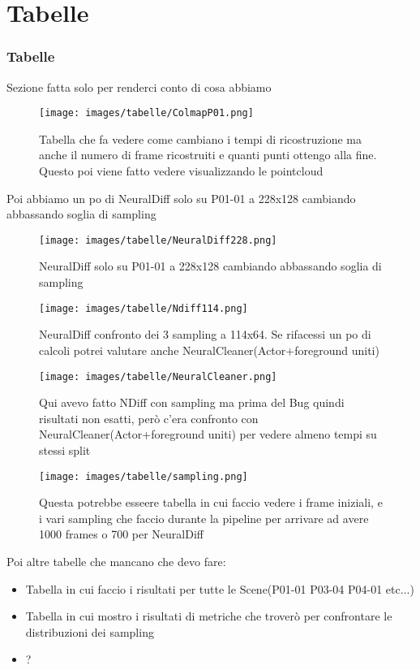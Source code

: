 \part{Tabelle}\label{sec:Tabelle}
\section{Tabelle}
Sezione fatta solo per renderci conto di cosa abbiamo
\begin{figure}
    \centering
    \texttt{[image: images/tabelle/ColmapP01.png]} 
    \caption{Tabella che fa vedere come cambiano i tempi di ricostruzione ma
    anche il numero di frame ricostruiti e quanti punti ottengo alla fine. Questo poi
    viene fatto vedere visualizzando le pointcloud}\label{fig:blender1}
\end{figure}


Poi abbiamo un po di NeuralDiff solo su P01-01 a 228x128 cambiando abbassando soglia di sampling
\begin{figure}[H]
    \centering
    \texttt{[image: images/tabelle/NeuralDiff228.png]} 
    \caption{NeuralDiff solo su P01-01 a 228x128 cambiando abbassando soglia di sampling}\label{fig:blender1}
\end{figure}
\begin{figure}[H]
    \centering
    \texttt{[image: images/tabelle/Ndiff114.png]} 
    \caption{NeuralDiff confronto dei 3 sampling a 114x64. Se rifacessi un po di calcoli potrei valutare anche NeuralCleaner(Actor+foreground uniti)}\label{fig:blender1}
\end{figure}
\begin{figure}[H]
    \centering
    \texttt{[image: images/tabelle/NeuralCleaner.png]} 
    \caption{Qui avevo fatto NDiff con sampling ma prima del Bug quindi risultati non esatti, però c'era confronto con NeuralCleaner(Actor+foreground uniti) per vedere almeno tempi su stessi split}\label{fig:blender1}
\end{figure}

\begin{figure}[H]
    \centering
    \texttt{[image: images/tabelle/sampling.png]} 
    \caption{Questa potrebbe esseere tabella in cui faccio vedere i frame iniziali, e i vari
    sampling che faccio durante la pipeline per arrivare ad avere 1000 frames o 700 per NeuralDiff}\label{fig:blender1}
\end{figure}
Poi altre tabelle che mancano che devo fare:
\begin{itemize}
    \item Tabella in cui faccio i risultati per tutte le Scene(P01-01 P03-04 P04-01 etc...)
    \item Tabella in cui mostro i risultati di metriche che troverò per confrontare le distribuzioni dei sampling
    \item ?
\end{itemize}
